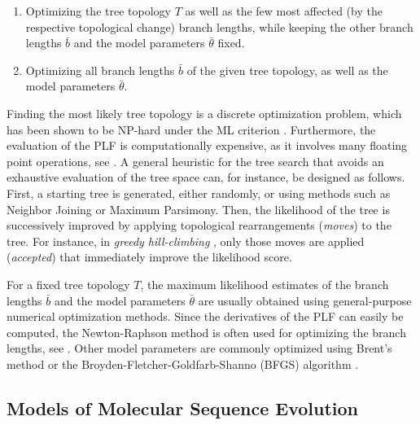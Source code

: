 \begin{enumerate}
    \item Optimizing the tree topology $T$ as well as the few most affected (by the respective topological change) branch lengths,
          while keeping the other branch lengths $\bar{b}$ and the model parameters $\bar{\theta}$ fixed.
    \item Optimizing all branch lengths $\bar{b}$ of the given tree topology, as well as the model parameters $\bar{\theta}$.
\end{enumerate}

Finding the most likely tree topology is a discrete optimization problem,
which has been shown to be NP-hard under the ML criterion \cite{Chor2005}.
Furthermore, the evaluation of the PLF is computationally expensive,
as it involves many floating point operations, see .
A general heuristic for the tree search that avoids an exhaustive evaluation of the tree space can,
for instance, be designed as follows.
First, a starting tree is generated, either randomly, or using methods such as Neighbor Joining or Maximum Parsimony.
Then, the likelihood of the tree is successively improved
by applying topological rearrangements (\emph{moves}) to the tree.
For instance, in \emph{greedy hill-climbing} \cite{Stamatakis2014}, only those moves are applied (\emph{accepted})
that immediately improve the likelihood score.

For a fixed tree topology $T$, the maximum likelihood estimates
of the branch lengths $\bar{b}$ and the model parameters $\bar{\theta}$
are usually obtained using general-purpose numerical optimization methods.
Since the derivatives of the PLF can easily be computed,
the Newton-Raphson method \cite{Ypma1995} is often used for optimizing the branch lengths,
see .
Other model parameters are commonly optimized using Brent's method \cite{Brent1971}
or the Broyden-Fletcher-Goldfarb-Shanno (BFGS) algorithm \cite{Fletcher1987}.


\subsection{Models of Molecular Sequence Evolution}
\label{ch:Foundations:sec:MLTreeInference:sub:ModelsOfSeqEvol}


